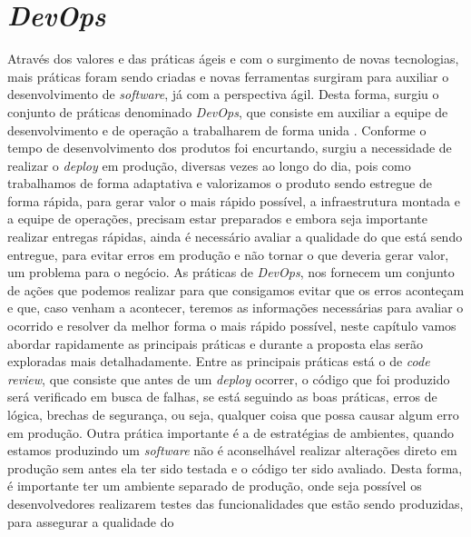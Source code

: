     \chapter{\textit{DevOps}}
      Através dos valores e das práticas ágeis e com o surgimento de novas
      tecnologias, mais práticas foram sendo criadas e novas ferramentas surgiram
      para auxiliar o desenvolvimento de \textit{software}, já com a perspectiva
      ágil. Desta forma, surgiu o conjunto de práticas denominado \textit{DevOps},
      que consiste em auxiliar a equipe de desenvolvimento e de operação a trabalharem
      de forma unida \cite{TheDevOpsHandbook}. Conforme o tempo de desenvolvimento
      dos produtos foi encurtando, surgiu a necessidade de realizar o \textit{deploy}
      em produção, diversas vezes ao longo do dia, pois como trabalhamos de forma
      adaptativa e valorizamos o produto sendo estregue de forma rápida, para gerar
      valor o mais rápido possível, a infraestrutura montada e a equipe de operações,
      precisam estar preparados e embora seja importante realizar entregas rápidas,
      ainda é necessário avaliar a qualidade do que está sendo entregue, para
      evitar erros em produção e não tornar o que deveria gerar valor, um problema
      para o negócio. \newline
      As práticas de \textit{DevOps}, nos fornecem um conjunto de ações que podemos
      realizar para que consigamos evitar que os erros aconteçam e que, caso venham
      a acontecer, teremos as informações necessárias para avaliar o ocorrido e
      resolver da melhor forma o mais rápido possível, neste capítulo vamos abordar
      rapidamente as principais práticas e durante a proposta elas serão exploradas
      mais detalhadamente. \newline
      Entre as principais práticas está o de \textit{code review}, que consiste
      que antes de um \textit{deploy} ocorrer, o código que foi produzido será
      verificado em busca de falhas, se está seguindo as boas práticas, erros de
      lógica, brechas de segurança, ou seja, qualquer coisa que possa causar algum
      erro em produção. Outra prática importante é a de estratégias de ambientes,
      quando estamos produzindo um \textit{software} não é aconselhável realizar
      alterações direto em produção sem antes ela ter sido testada e o código
      ter sido avaliado. Desta forma, é importante ter um ambiente separado de
      produção, onde seja possível os desenvolvedores realizarem testes das
      funcionalidades que estão sendo produzidas, para assegurar a qualidade do
